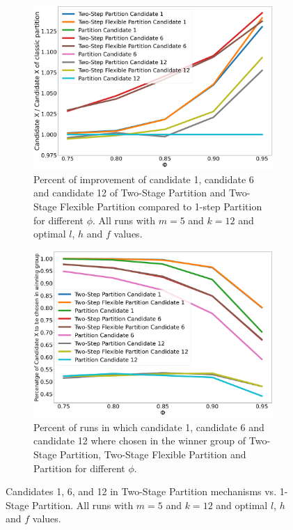 \documentclass[letterpaper]{article} %
\begin{document}
\begin{figure}[t]
\centering
 \begin{subfigure}{0.8\columnwidth}
 \includegraphics[width=\columnwidth]{"../images/improve_in_candidates_review_5_winner_12_new_new_new.png"}
 \caption{Percent of improvement of candidate 1, candidate 6 and candidate 12 of Two-Stage Partition and Two-Stage Flexible Partition compared to 1-step Partition for different $\phi$. All runs with $m = 5$ and $k = 12$ and optimal $l$, $h$ and $f$ values.}
 \label{fig:candidates-performances_per_candidates}
 \end{subfigure}%
\vspace{1cm}
 \begin{subfigure}{0.8\columnwidth}
 \includegraphics[width=\columnwidth]{"../images/improve_in_candidates_review_5_winner_12_percenatge_new_new_new.png"}
 \caption{Percent of runs in which candidate 1, candidate 6 and candidate 12 where chosen in the winner group of Two-Stage Partition, Two-Stage Flexible Partition and Partition for different $\phi$.}
 \label{fig:candidates-performances_per_candidates_in_winning_group}
 \end{subfigure}
 \label{fig:first}
 \caption{Candidates 1, 6, and 12 in Two-Stage Partition mechanisms vs. 1-Stage Partition. All runs with $m = 5$ and $k = 12$ and optimal $l$, $h$ and $f$ values.}
\end{figure}
\end{document}
